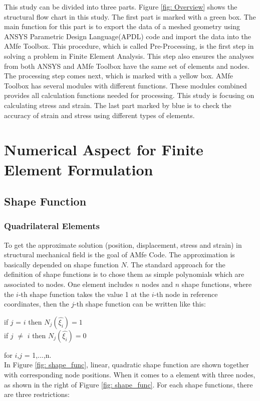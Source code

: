This study can be divided into three parts.  Figure \ref{fig: Overview} shows the structural flow chart in this study. The first part is marked with a green box. The main function for this part is to export the data of a meshed geometry using ANSYS Parametric Design Language(APDL) code and import the data into the AMfe Toolbox. This procedure, which is called Pre-Processing, is the first step in solving a problem in Finite Element Analysis. This step also ensures the analyses from both ANSYS and AMfe Toolbox have the same set of elements and nodes. The processing step comes next, which is marked with a yellow box. AMfe Toolbox has several modules with different functions. These modules combined provides all calculation functions needed for processing. This study is focusing on calculating stress and strain. The last part marked by blue is to check the accuracy of strain and stress using different types of elements.

\chapter{Numerical Aspect for Finite Element Formulation}
\section{Shape Function}
\subsection{Quadrilateral Elements}
To get the approximate solution (position, displacement, stress and strain) in structural mechanical field is the goal of AMfe Code.  The approximation is basically depended on shape function $N$. The standard approach for the definition of shape functions is to chose them as simple polynomials which are associated to nodes. One element includes $n$ nodes and $n$ shape functions, where the $i$-th shape function takes the value 1 at the $i$-th node in reference coordinates, then the $j$-th shape function can be written like this: \\

\begin{center}
	if $j$ = $i$ then $N_j\left(\hat{\xi_i}\right) = 1$ \\
	if $j$ $\neq$ $i$ then $N_j\left(\hat{\xi_i}\right) = 0$
\end{center}

for $i$,$j$ = 1,...,n. \\
In Figure \ref{fig: shape_func}, linear, quadratic shape function are shown together with corresponding node positions. When it comes to a element with three nodes, as shown in the right of Figure \ref{fig: shape_func}. For each shape functions, there are three restrictions:

